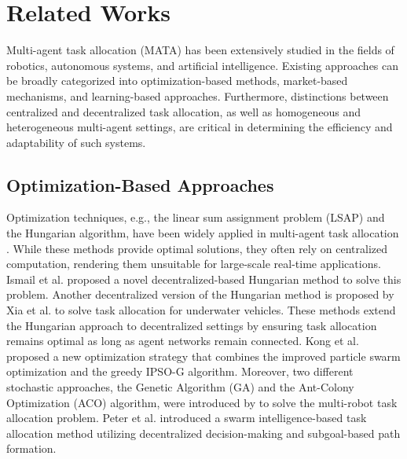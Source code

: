 \section{Related Works}
Multi-agent task allocation (MATA) has been extensively studied in the fields of robotics, autonomous systems, and artificial intelligence. Existing approaches can be broadly categorized into optimization-based methods, market-based mechanisms, and learning-based approaches. Furthermore, distinctions between centralized and decentralized task allocation, as well as homogeneous and heterogeneous multi-agent settings, are critical in determining the efficiency and adaptability of such systems.

\subsection{Optimization-Based Approaches}
Optimization techniques, e.g., the linear sum assignment problem (LSAP) and the Hungarian algorithm, have been widely applied in multi-agent task allocation \cite{goarin2024graph}. While these methods provide optimal solutions, they often rely on centralized computation, rendering them unsuitable for large-scale real-time applications. Ismail et al. \cite{ismail2017decentralized} proposed a novel decentralized-based Hungarian method to solve this problem. Another decentralized version of the Hungarian method is proposed by Xia et al. \cite{xia} to solve task allocation for underwater vehicles. These methods extend the Hungarian approach to decentralized settings by ensuring task allocation remains optimal as long as agent networks remain connected. Kong et al. \cite{greedy} proposed a new optimization strategy that combines the improved particle swarm optimization and the greedy IPSO-G algorithm. Moreover, two different stochastic approaches, the Genetic Algorithm (GA) and the Ant-Colony Optimization (ACO) algorithm, were introduced by \cite{genetic} to solve the multi-robot task allocation problem. Peter et al. \cite{neurofleets} introduced a swarm intelligence-based task allocation method utilizing decentralized decision-making and subgoal-based path formation.

